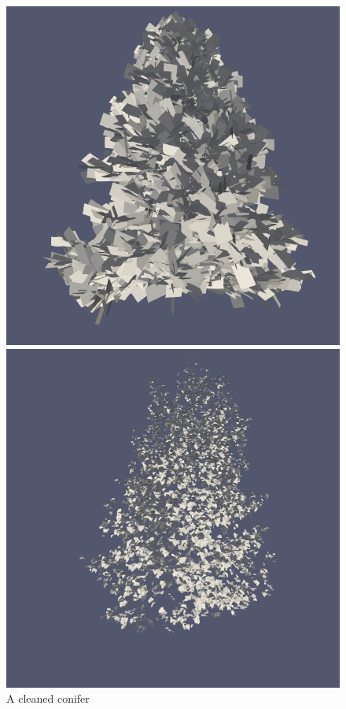 \documentclass[12pt]{article}
\begin{document}
\begin{figure}[H]
    \centering
    \begin{minipage}{0.30\textwidth}
        \centering
        \includegraphics[width=1\textwidth]{images/tree-conifer.png}
        \caption{A cleaned conifer}
    \end{minipage}
    \begin{minipage}{0.30\textwidth}
        \centering
        \includegraphics[width=1\textwidth]{images/tree-ginkgo.png}

\end{minipage}
\end{figure}
\end{document}
